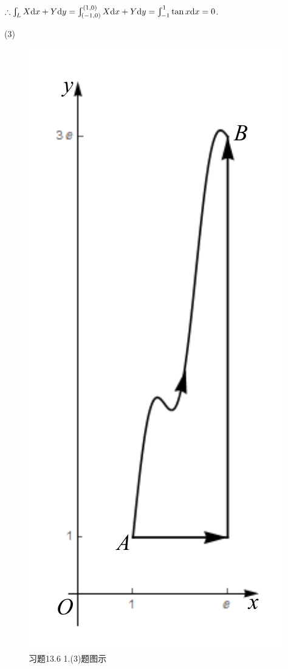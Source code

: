 \documentclass[12pt,UTF8]{ctexart}
\newcommand{\Int}[4]{\varint\nolimits_{#1}^{#2}#3\mathrm d#4}
\newcommand{\BLInt}[2]{\varint\nolimits_{#1}#2}
\newcommand{\md}[1]{\mathrm d#1}
\begin{document}
\begin{enumerate}
$\therefore\BLInt L{X\md x+Y\md y}=\varint_{(-1,0)}^{(1,0)}{X\md x+Y\md y}=\Int{-1}1{\tan x}x=0$.

(3)
\begin{figure}[H]
\begin{center}
\includegraphics[height=0.5\textheight]{Figures25/Fig13-6-1-3.pdf}
\end{center}
\caption{习题13.6 1.(3)题图示}
\label{13-6-1-3}
\end{figure}


\end{enumerate}
\end{document}
